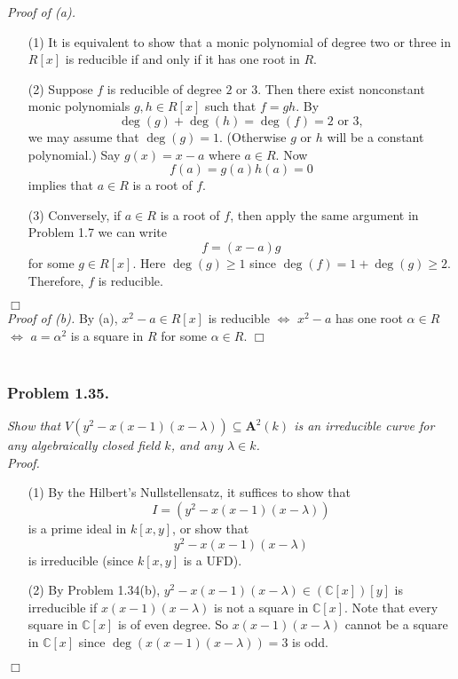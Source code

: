 \documentclass{article}
\begin{document}
\emph{Proof of (a).}
\begin{enumerate}
\item[(1)]
  It is equivalent to show that
  a monic polynomial of degree two or three in $R[x]$ is reducible
  if and only if it has one root in $R$.

\item[(2)]
  Suppose $f$ is reducible of degree $2$ or $3$.
  Then there exist nonconstant monic polynomials $g, h \in R[x]$ such that $f = gh$.
  By
  \[
    \deg(g) + \deg(h) = \deg(f) = 2 \text{ or } 3,
  \]
  we may assume that $\deg(g) = 1$. (Otherwise $g$ or $h$ will be a constant polynomial.)
  Say $g(x) = x - a$ where $a \in R$.
  Now
  \[
    f(a) = g(a)h(a) = 0
  \]
  implies that $a \in R$ is a root of $f$.

\item[(3)]
  Conversely, if $a \in R$ is a root of $f$, then
  apply the same argument in Problem 1.7 we can write
  \[
    f = (x - a)g
  \]
  for some $g \in R[x]$.
  Here $\deg(g) \geq 1$ since $\deg(f) = 1 + \deg(g) \geq 2$.
  Therefore, $f$ is reducible.
\end{enumerate}
$\Box$ \\



\emph{Proof of (b).}
  By (a),
  $x^2-a \in R[x]$ is reducible $\Longleftrightarrow$
  $x^2-a$ has one root $\alpha \in R$ $\Longleftrightarrow$
  $a = \alpha^2$ is a square in $R$ for some $\alpha \in R$.
$\Box$ \\\\






\subsubsection*{Problem 1.35.}
\emph{Show that $V(y^2-x(x-1)(x-\lambda)) \subseteq \mathbf{A}^2(k)$
is an irreducible curve for any algebraically closed field $k$,
and any $\lambda \in k$.} \\

\emph{Proof.}
\begin{enumerate}
\item[(1)]
  By the Hilbert's Nullstellensatz, it suffices to show that
  \[
    I = (y^2-x(x-1)(x-\lambda))
  \]
  is a prime ideal in $k[x,y]$, or show that
  \[
    y^2-x(x-1)(x-\lambda)
  \]
  is irreducible (since $k[x,y]$ is a UFD).

\item[(2)]
  By Problem 1.34(b),
  $y^2-x(x-1)(x-\lambda) \in (\mathbb{C}[x])[y]$ is irreducible
  if $x(x-1)(x-\lambda)$ is not a square in $\mathbb{C}[x]$.
  Note that every square in $\mathbb{C}[x]$ is of even degree.
  So $x(x-1)(x-\lambda)$ cannot be a square in $\mathbb{C}[x]$
  since $\deg(x(x-1)(x-\lambda)) = 3$ is odd.
\end{enumerate}
$\Box$ \\
\end{document}
